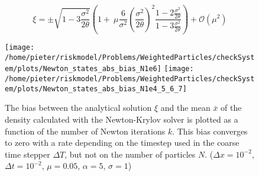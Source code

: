 \begin{equation}
\xi = \pm \sqrt{1-3\frac{\sigma^2}{2\theta}}\left(1+
\ \mu \frac{6}{\sigma^2}\left(\frac{\sigma^2}{2\theta}\right)^2\frac{1-2\frac{\sigma^2}{2\theta} }{1-3\frac{\sigma^2}{2\theta}}\right) + \mathcal{O}(\mu^2)
\end{equation}  







%
%


\begin{figure}
\centering
\texttt{[image: /home/pieter/riskmodel/Problems/WeightedParticles/checkSystem/plots/Newton\_states\_abs\_bias\_N1e6]}
\texttt{[image: /home/pieter/riskmodel/Problems/WeightedParticles/checkSystem/plots/Newton\_states\_abs\_bias\_N1e4\_5\_6\_7]}
\caption{The bias between the analytical solution $\xi$ and the mean $\bar{x}$ of the density calculated with the Newton-Krylov solver is plotted as a function of the number of Newton iterations $k$. This bias converges to zero with a rate depending on the timestep used in the coarse time stepper $\Delta T$, but not on the number of particles $N$.  ($\Delta x = 10^{-2}$, $\Delta t = 10^{-2}$, $\mu=0.05$, $\alpha=5$, $\sigma=1$)}
\label{fig:Newton_states_bias_mean}
\end{figure}

%

